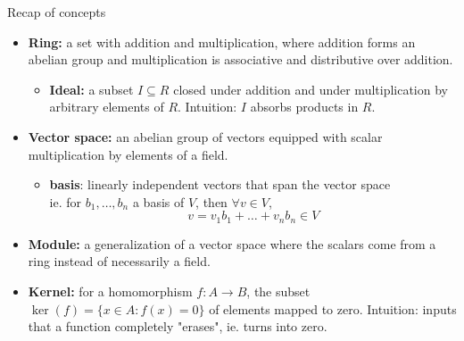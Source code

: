 \documentclass{beamer}
\theoremstyle{customstyle}
\begin{document}
\begin{frame}{Recap of concepts}
  \begin{itemize}
    \item \textbf{Ring:} a set with addition and multiplication, where addition forms an abelian group and multiplication is associative and distributive over addition.
    \begin{itemize}
      \item \textbf{Ideal:} a subset $I \subseteq R$ closed under addition and under multiplication by arbitrary elements of $R$.
      \scriptsize{
      \colorbox{gray!20}{Intuition:
	$I$ absorbs products in $R$.
      }}
    \end{itemize}

    \item \textbf{Vector space:} an abelian group of vectors equipped with scalar multiplication by elements of a field.
      \scriptsize{
      \begin{itemize}
	\item \textbf{basis}: linearly independent vectors that span the vector space\\
	  ie. for $b_1, \ldots, b_n$ a basis of $V$, then $\forall v \in V$,
	  $$v=v_1 b_1 + \ldots + v_n b_n \in V$$
      \end{itemize}
      }

    \normalsize
    \item \textbf{Module:} a generalization of a vector space where the scalars come from a ring instead of necessarily a field.

    \normalsize
    \item \textbf{Kernel:} for a homomorphism $f:A\to B$, the subset
    $\ker(f)=\{x\in A:f(x)=0\}$ of elements mapped to zero.
      \scriptsize{
      \colorbox{gray!20}{Intuition:
       inputs that a function completely "erases", ie. turns into zero.
      }}

  \end{itemize}
\end{frame}
\end{document}
